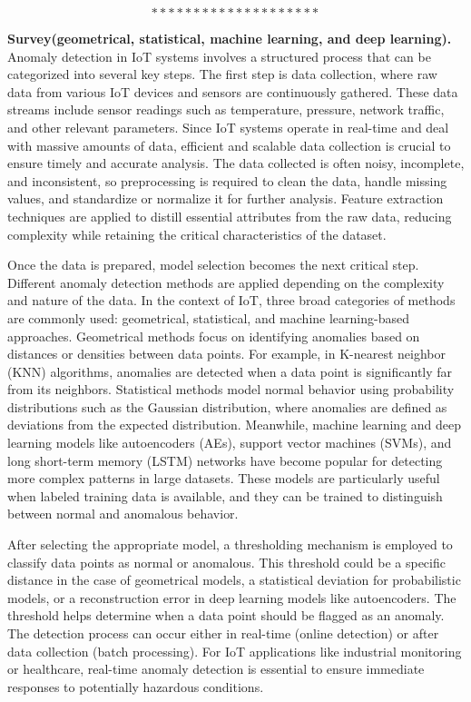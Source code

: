 $$********************$$

\textbf{Survey(geometrical, statistical, machine learning, and deep learning). } Anomaly detection in IoT systems involves a structured process that can be categorized into several key steps. The first step is data collection, where raw data from various IoT devices and sensors are continuously gathered. These data streams include sensor readings such as temperature, pressure, network traffic, and other relevant parameters. Since IoT systems operate in real-time and deal with massive amounts of data, efficient and scalable data collection is crucial to ensure timely and accurate analysis. The data collected is often noisy, incomplete, and inconsistent, so preprocessing is required to clean the data, handle missing values, and standardize or normalize it for further analysis. Feature extraction techniques are applied to distill essential attributes from the raw data, reducing complexity while retaining the critical characteristics of the dataset.

Once the data is prepared, model selection becomes the next critical step. Different anomaly detection methods are applied depending on the complexity and nature of the data. In the context of IoT, three broad categories of methods are commonly used: geometrical, statistical, and machine learning-based approaches. Geometrical methods focus on identifying anomalies based on distances or densities between data points. For example, in K-nearest neighbor (KNN) algorithms, anomalies are detected when a data point is significantly far from its neighbors. Statistical methods model normal behavior using probability distributions such as the Gaussian distribution, where anomalies are defined as deviations from the expected distribution. Meanwhile, machine learning and deep learning models like autoencoders (AEs), support vector machines (SVMs), and long short-term memory (LSTM) networks have become popular for detecting more complex patterns in large datasets. These models are particularly useful when labeled training data is available, and they can be trained to distinguish between normal and anomalous behavior.

After selecting the appropriate model, a thresholding mechanism is employed to classify data points as normal or anomalous. This threshold could be a specific distance in the case of geometrical models, a statistical deviation for probabilistic models, or a reconstruction error in deep learning models like autoencoders. The threshold helps determine when a data point should be flagged as an anomaly. The detection process can occur either in real-time (online detection) or after data collection (batch processing). For IoT applications like industrial monitoring or healthcare, real-time anomaly detection is essential to ensure immediate responses to potentially hazardous conditions.

